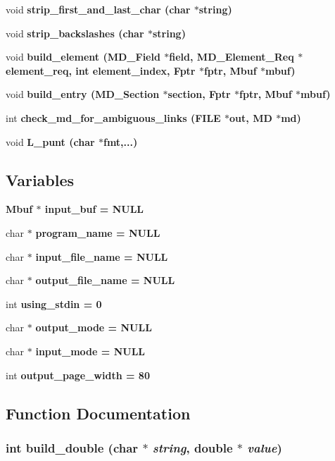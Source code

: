 \begin{CompactItemize}
\item 
void \bf{strip\_\-first\_\-and\_\-last\_\-char} (char $\ast$string)
\item 
void \bf{strip\_\-backslashes} (char $\ast$string)
\item 
void \bf{build\_\-element} (\bf{MD\_\-Field} $\ast$field, \bf{MD\_\-Element\_\-Req} $\ast$element\_\-req, int element\_\-index, \bf{Fptr} $\ast$fptr, \bf{Mbuf} $\ast$mbuf)
\item 
void \bf{build\_\-entry} (\bf{MD\_\-Section} $\ast$section, \bf{Fptr} $\ast$fptr, \bf{Mbuf} $\ast$mbuf)
\item 
int \bf{check\_\-md\_\-for\_\-ambiguous\_\-links} (FILE $\ast$out, \bf{MD} $\ast$md)
\item 
void \bf{L\_\-punt} (char $\ast$fmt,...)
\end{CompactItemize}
\subsection*{Variables}
\begin{CompactItemize}
\item 
\bf{Mbuf} $\ast$ \bf{input\_\-buf} = \bf{NULL}
\item 
char $\ast$ \bf{program\_\-name} = \bf{NULL}
\item 
char $\ast$ \bf{input\_\-file\_\-name} = \bf{NULL}
\item 
char $\ast$ \bf{output\_\-file\_\-name} = \bf{NULL}
\item 
int \bf{using\_\-stdin} = 0
\item 
char $\ast$ \bf{output\_\-mode} = \bf{NULL}
\item 
char $\ast$ \bf{input\_\-mode} = \bf{NULL}
\item 
int \bf{output\_\-page\_\-width} = 80
\end{CompactItemize}


\subsection{Function Documentation}
\subsubsection{\setlength{\rightskip}{0pt plus 5cm}int build\_\-double (char $\ast$ {\em string}, double $\ast$ {\em value})}\label{md__compiler_8c_0532d81cd75c1447810194f860b849a2}




